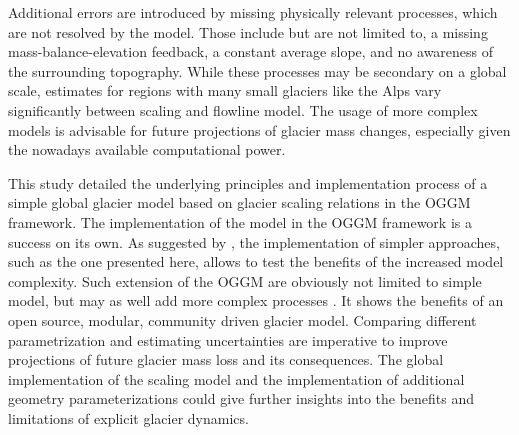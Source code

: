 Additional errors are introduced by missing physically relevant processes, which are not resolved by the \vas{} model. Those include but are not limited to, a missing mass-balance-elevation feedback, a constant average slope, and no awareness of the surrounding topography. While these processes may be secondary on a global scale, estimates for regions with many small glaciers like the Alps vary significantly between scaling and flowline model. The usage of more complex models is advisable for future projections of glacier mass changes, especially given the nowadays available computational power.

This study detailed the underlying principles and implementation process of a simple global glacier model based on glacier scaling relations \citep{Marzeion2012b} in the OGGM framework. The implementation of the \vas{} model in the OGGM framework is a success on its own. As suggested by \citet{Maussion2019}, the implementation of simpler approaches, such as the one presented here, allows to test the benefits of the increased model complexity. Such extension of the OGGM are obviously not limited to simple model, but may as well add more complex processes \citep[e.g., an improved calving parametrization,][]{Recinos2019}. It shows the benefits of an open source, modular, community driven glacier model. Comparing different parametrization and estimating uncertainties are imperative to improve projections of future glacier mass loss and its consequences. The global implementation of the scaling model and the implementation of additional geometry parameterizations \citep[e.g., GloGEM by][]{Huss2015} could give further insights into the benefits and limitations of explicit glacier dynamics.

